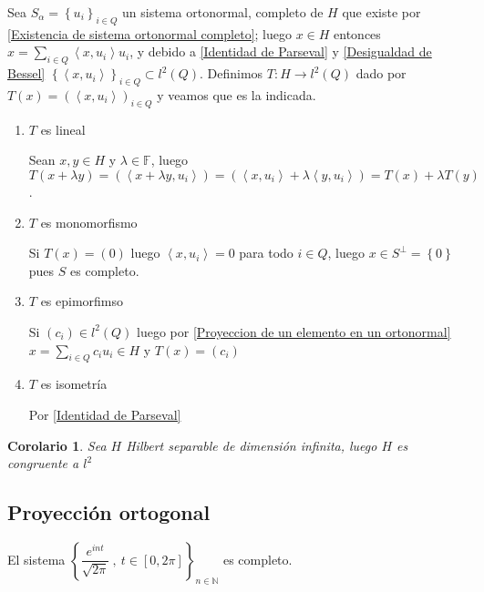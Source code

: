 \documentclass[11pt]{article}
\newcommand{\N}{{\mathbb{N}}}
\newcommand{\ip}[1]{\left\langle#1\right\rangle}
\newcommand{\sett}[1]{\left\lbrace#1\right\rbrace}
\newcommand{\Bigsum}[2]{\sum\limits_{#1}{#2}}
\numberwithin{theorem}{subsection}
\newtheorem{corollary}[theorem]{Corolario}
\newenvironment{proof}[1][Demostraci\'on]{\begin{trivlist}
		\item[\hskip \labelsep {\bfseries #1}]}{\end{trivlist}}
\newenvironment{example}[1][Ejemplo]{\begin{trivlist}
		\item[\hskip \labelsep {\bfseries #1 }]}{\end{trivlist}}
\newcommand{\qed}{\nobreak \ifvmode \relax \else
	\ifdim\lastskip<1.5em \hskip-\lastskip
	\hskip1.5em plus0em minus0.5em \fi \nobreak
	\vrule height0.75em width0.5em depth0.25em\fi}
\begin{document}
\begin{proof}
	Sea $S_{\alpha} = \sett{u_i}_{i \in Q}$ un sistema ortonormal, completo de $H$ que existe por \ref{Existencia de sistema ortonormal completo}; luego $x \in H$ entonces $x = \Bigsum{i \in Q}{\ip{x,u_i}u_i}$, y debido a \ref{Identidad de Parseval} y \ref{Desigualdad de Bessel} $\sett{\ip{x,u_i}}_{i \in Q} \subset l^2(Q)$. Definimos $T : H \rightarrow l^2(Q)$ dado por $T(x) = (\ip{x,u_i})_{i \in Q}$ y veamos que es la indicada.
	
	\begin{enumerate}
		\item $T$ es lineal
		
		Sean $x,y \in H$ y $\lambda \in \mathbb{F}$, luego $T(x + \lambda y) = \left(\ip{x+\lambda y , u_i}\right) = \left( \ip{x,u_i} + \lambda \ip{y,u_i} \right) = T(x) + \lambda T(y)$.
		
		\item $T$ es monomorfismo
		
		Si $T(x) = (0)$ luego $\ip{x,u_i} = 0$ para todo $i \in Q$, luego $x \in S^{\perp} = \sett{0}$ pues $S$ es completo.
		
		\item $T$ es epimorfimso
		
		Si $(c_i) \in l^2(Q)$ luego por \ref{Proyeccion de un elemento en un ortonormal} $x = \Bigsum{i \in Q}{c_i u_i} \in H$ y $T(x) = (c_i)$
		
		\item $T$ es isometr\'ia
		
		Por \ref{Identidad de Parseval}
		
	\end{enumerate}
	\qed
\end{proof}


\begin{corollary}
	Sea $H$ Hilbert separable de dimensi\'on infinita, luego $H$ es congruente a $l^2$
\end{corollary}

\subsection{Proyecci\'on ortogonal}

\begin{example}
	El sistema $\sett{\dfrac{e^{int}}{\sqrt{2 \pi}} \ , \ t \in [0,2 \pi]}_{n \in \N}$ es completo.
\end{example}
\end{document}
